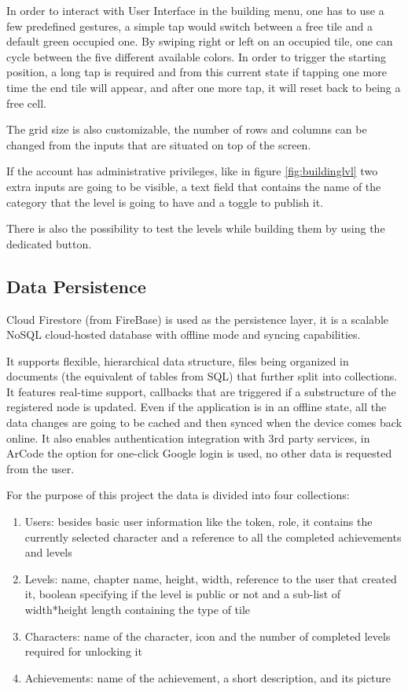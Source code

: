 \documentclass[12 pct]{report}
\begin{document}
In order to interact with User Interface in the building menu, one has to use a few predefined gestures, a simple tap would switch between a free tile and a default green occupied one. By swiping right or left on an occupied tile, one can cycle between the five different available colors. In order to trigger the starting position, a long tap is required and from this current state if tapping one more time the end tile will appear, and after one more tap, it will reset back to being a free cell.

The grid size is also customizable, the number of rows and columns can be changed from the inputs that are situated on top of the screen. 

If the account has administrative privileges, like in figure \ref{fig:buildinglvl} two extra inputs are going to be visible, a text field that contains the name of the category that the level is going to have and a toggle to publish it. 

There is also the possibility to test the levels while building them by using the dedicated button.

\subsection*{Data Persistence}
Cloud Firestore (from FireBase) is used as the persistence layer, it is a scalable NoSQL cloud-hosted database with offline mode and syncing capabilities.

It supports flexible, hierarchical data structure, files being organized in documents (the equivalent of tables from SQL) that further split into collections. It features real-time support, callbacks that are triggered if a substructure of the registered node is updated. Even if the application is in an offline state, all the data changes are going to be cached and then synced when the device comes back online. It also enables authentication integration with 3rd party services, in ArCode the option for one-click Google login is used, no other data is requested from the user.

For the purpose of this project the data is divided into four collections:
\begin{enumerate}
\item Users: besides basic user information like the token, role, it contains the currently selected character and a reference to all the completed achievements and levels
\item Levels: name, chapter name, height, width, reference to the user that created it, boolean specifying if the level is public or not and a sub-list of width*height length containing the type of tile
\item Characters: name of the character, icon and the number of completed levels required for unlocking it
\item Achievements: name of the achievement, a short description, and its picture
\end{enumerate}
\end{document}

